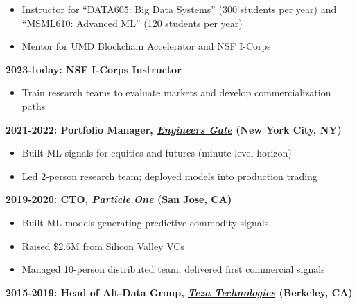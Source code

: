 \documentclass[10pt, letterpaper]{article}
\providecommand{\tightlist}{%
\setlength{\itemsep}{0pt}
\setlength{\parskip}{0pt}}
\begin{document}
  \begin{itemize}
    \tightlist

    \item Instructor for ``DATA605: Big Data Systems'' (300 students per
      year) and ``MSML610: Advanced ML'' (120 students per year)

    \item Mentor for \href{https://www.rhsmith.umd.edu/centers-initiatives/supply-chain-management-center/initiatives-programs/blockchain-accelerator}{UMD
      Blockchain Accelerator} and \href{https://beta.nsf.gov/funding/initiatives/i-corps}{NSF
      I-Corps}
  \end{itemize}

  \textbf{2023-today: NSF I-Corps Instructor}

  \begin{itemize}
    \tightlist

    \item Train research teams to evaluate markets and develop commercialization
      paths
  \end{itemize}

  \textbf{2021-2022: Portfolio Manager,
  \href{https://www.eglp.com/}{\emph{Engineers Gate}} (New York City, NY)}

  \begin{itemize}
    \tightlist

    \item Built ML signals for equities and futures (minute-level
      horizon)

    \item Led 2-person research team; deployed models into production
      trading
  \end{itemize}

  \textbf{2019-2020: CTO,
  \href{https://www.particle.one/}{\emph{Particle.One}} (San Jose, CA)}

  \begin{itemize}
    \tightlist

    \item Built ML models generating predictive commodity signals

    \item Raised \$2.6M from Silicon Valley VCs

    \item Managed 10-person distributed team; delivered first commercial
      signals
  \end{itemize}

  \textbf{2015-2019: Head of Alt-Data Group,
  \href{https://www.teza.com/}{\emph{Teza Technologies}} (Berkeley, CA)}
\end{document}
